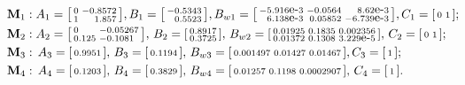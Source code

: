 \documentclass[letterpaper, 10 pt, conference]{amsart}
\theoremstyle{definition}
\theoremstyle{example}
\theoremstyle{remark}
\begin{document}
 \begin{align*}
&\mathbf M_{1}: A_{1}=\begin{bsmallmatrix*}[r]            
      0 & -0.8572 \\ 
       1 &   1.857
   \end{bsmallmatrix*}, B_{1}=\begin{bsmallmatrix*}[r]     -0.5343 \\ 
  0.5523 \end{bsmallmatrix*}, B_{w1}=\begin{bsmallmatrix*}[r]-5.916\mbox{e-}3 & -0.0564 &  8.62\mbox{e-}3 \\ 
 6.138\mbox{e-}3 & 0.05852 &-6.739\mbox{e-}3 
\end{bsmallmatrix*},C_{1}= \begin{bsmallmatrix*}[l]      0 &       1 \end{bsmallmatrix*}; \!\!\!\!\\
&\mathbf M_{2}:A_{2} =\begin{bsmallmatrix*}[l]             
      0 &-0.05267 \\ 
   0.125 & -0.1081 
   \end{bsmallmatrix*},\,B_{2}=\begin{bsmallmatrix*}[l]
    0.8917 \\ 
  0.3725\end{bsmallmatrix*},\,B_{w2}=\begin{bsmallmatrix*}[l] 0.01925 &  0.1835 &0.002356 \\ 
 0.01372 &  0.1308 &3.229\mbox{e-}5 
\end{bsmallmatrix*},\,C_{2}= \begin{bsmallmatrix*}[l]    0 &       1 \end{bsmallmatrix*}; \\
&\mathbf M_{3}:\,A_{3} =\begin{bsmallmatrix}              
  0.9951  \end{bsmallmatrix},\,B_{3}=\begin{bsmallmatrix}        0.1194 \end{bsmallmatrix},\,B_{w3}=\begin{bsmallmatrix*}[l]
0.001497 & 0.01427 & 0.01467\end{bsmallmatrix*},C_{3}= \begin{bsmallmatrix}       1\end{bsmallmatrix}; \\
&\mathbf M_{4}:\,A_{4}=\begin{bsmallmatrix}              
0.1203 
   \end{bsmallmatrix},\,B_{4}=\begin{bsmallmatrix}
       0.3829 \end{bsmallmatrix},\,B_{w4}=\begin{bsmallmatrix*}[l]
     0.01257 &  0.1198 &0.0002907
\end{bsmallmatrix*},\,C_{4}= \begin{bsmallmatrix}            1\end{bsmallmatrix}. \end{align*}
\end{document}
